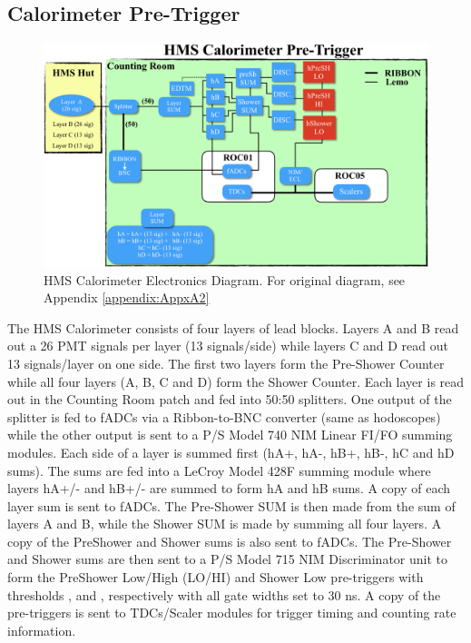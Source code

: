 \documentclass[11pt]{article}
\begin{document}
\subsection{Calorimeter Pre-Trigger}
\begin{figure}[h!]
  \centering
  \includegraphics[scale=0.5]{hCAL_diagram.png}
  \caption{HMS Calorimeter Electronics Diagram. For original diagram, see Appendix \ref{appendix:AppxA2}}
  \label{fig:hCAL_diagram}
\end{figure}
\noindent The HMS Calorimeter consists of four layers of lead blocks. Layers A and B read out a 26 PMT signals per layer (13 signals/side) while layers C and D
read out 13 signals/layer on one side. The first two layers form the Pre-Shower Counter while all four layers (A, B, C and D) form the Shower Counter.  
Each layer is read out in the Counting Room patch and fed into 50:50 splitters. One output of the splitter is fed to fADCs via a Ribbon-to-BNC converter (same as hodoscopes)
while the other output is sent to a P/S Model 740 NIM Linear FI/FO summing modules. Each side of a layer is summed first (hA+, hA-, hB+, hB-, hC and hD sums). The sums are fed into
a LeCroy Model 428F summing module where layers hA+/- and hB+/- are summed to form hA and hB sums. A copy of each layer sum is sent to fADCs. The Pre-Shower SUM is then made from the sum of layers A and B, while the Shower SUM is made by summing all four layers. A copy of the PreShower and Shower sums is also sent to fADCs. The Pre-Shower and Shower sums are then sent to a P/S Model 715
NIM Discriminator unit to form the PreShower Low/High (LO/HI) and Shower Low pre-triggers with thresholds \hPrShLo, \hPrShHi and \hSHLo, respectively with all gate widths set to 30 ns. A copy of the pre-triggers is sent to TDCs/Scaler modules for trigger timing and counting rate
information.
\end{document}
